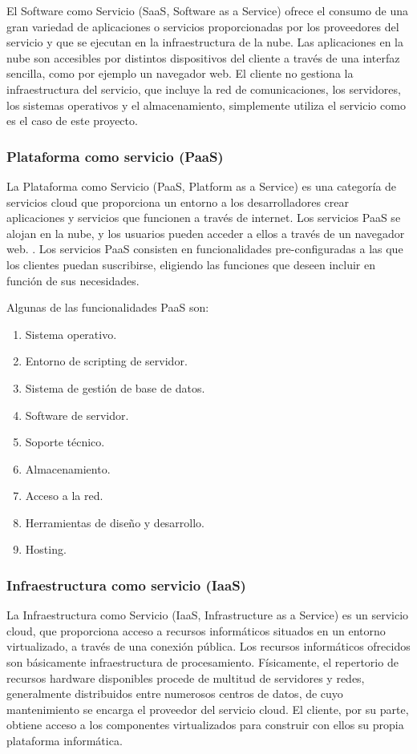 \documentclass[a4paper,11pt]{book}
\begin{document}
El Software como Servicio\cite{saas} (SaaS, Software as a Service) ofrece el consumo de una gran variedad de aplicaciones o servicios proporcionadas por los proveedores del servicio y que se ejecutan en la infraestructura de la nube. Las aplicaciones en la nube son accesibles por distintos dispositivos del cliente a través de una interfaz sencilla, como por ejemplo un navegador web. El cliente no gestiona la infraestructura del servicio, que incluye la red de comunicaciones, los servidores, los sistemas operativos y el almacenamiento, simplemente utiliza el servicio como es el caso de este proyecto. 

\subsubsection{Plataforma como servicio (PaaS)}

La Plataforma como Servicio\cite{paas} (PaaS, Platform as a Service) es una categoría de servicios cloud que proporciona un entorno a los desarrolladores crear aplicaciones y servicios que funcionen a través de internet. Los servicios PaaS se alojan en la nube, y los usuarios pueden acceder a ellos a través de un navegador web. . Los servicios PaaS consisten en funcionalidades pre-configuradas a las que los clientes puedan suscribirse, eligiendo las funciones que deseen incluir en función de sus necesidades.

Algunas de las funcionalidades PaaS son:

\begin{enumerate}
\item Sistema operativo. 
\item Entorno de scripting de servidor. 
\item Sistema de gestión de base de datos. 
\item Software de servidor. 
\item Soporte técnico. 
\item Almacenamiento. 
\item Acceso a la red. 
\item Herramientas de diseño y desarrollo. 
\item Hosting. 
\end{enumerate}

\subsubsection{Infraestructura como servicio (IaaS)}

La Infraestructura como Servicio\cite{iaas} (IaaS, Infrastructure as a Service) es un servicio cloud, que proporciona acceso a recursos informáticos situados en un entorno virtualizado, a través de una conexión pública. Los recursos informáticos ofrecidos  son básicamente infraestructura de procesamiento. Físicamente, el repertorio de recursos hardware disponibles procede de multitud de servidores y redes, generalmente distribuidos entre numerosos centros de datos, de cuyo mantenimiento se encarga el proveedor del servicio cloud. El cliente, por su parte, obtiene acceso a los componentes virtualizados para construir con ellos su propia plataforma informática.
\end{document}
